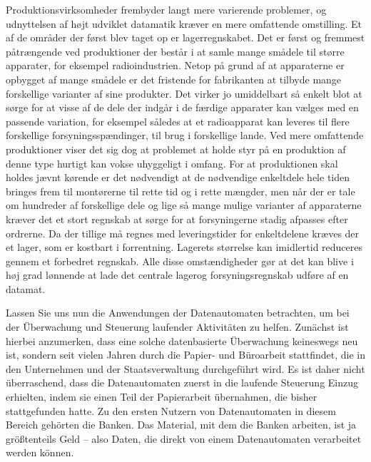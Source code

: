 {Produktionsvirksomheder frembyder langt mere varierende problemer, og udnyttelsen af højt udviklet datamatik kræver en mere omfattende omstilling. Et af de områder der først blev taget op er lagerregnskabet. Det er først og fremmest påtrængende ved produktioner der består i at samle mange smådele til større apparater, for eksempel radioindustrien. Netop på grund af at apparaterne er opbygget af mange smådele er det fristende for fabrikanten at tilbyde mange forskellige varianter af sine produkter. Det virker jo umiddelbart så enkelt blot at sørge for at visse af de dele der indgår i de færdige apparater kan vælges med en passende variation, for eksempel således at et radioapparat kan leveres til flere forskellige forsyningsspændinger, til brug i forskellige lande. Ved mere omfattende produktioner viser det sig dog at problemet at holde styr på en produktion af denne type hurtigt kan vokse uhyggeligt i omfang. For at produktionen skal holdes jævnt kørende er det nødvendigt at de nødvendige enkeltdele hele tiden bringes frem til montørerne til rette tid og i rette mængder, men når der er tale om hundreder af forskellige dele og lige så mange mulige varianter af apparaterne kræver det et stort regnskab at sørge for at forsyningerne stadig afpasses efter ordrerne. Da der tillige må regnes med leveringstider for enkeltdelene kræves der et lager, som er kostbart i forrentning. Lagerets størrelse kan imidlertid reduceres gennem et forbedret regnskab. Alle disse omstændigheder gør at det kan blive i høj grad lønnende at lade det centrale lagerog forsyningsregnskab udføre af en datamat. 
}{
Lassen Sie uns nun die Anwendungen der Datenautomaten betrachten, um bei der Überwachung und Steuerung laufender Aktivitäten zu helfen. Zunächst ist hierbei anzumerken, dass eine solche datenbasierte Überwachung keineswegs neu ist, sondern seit vielen Jahren durch die Papier- und Büroarbeit stattfindet, die in den Unternehmen und der Staatsverwaltung durchgeführt wird. Es ist daher nicht überraschend, dass die Datenautomaten zuerst in die laufende Steuerung Einzug erhielten, indem sie einen Teil der Papierarbeit übernahmen, die bisher stattgefunden hatte. Zu den ersten Nutzern von Datenautomaten in diesem Bereich gehörten die Banken. Das Material, mit dem die Banken arbeiten, ist ja größtenteils Geld -- also Daten, die direkt von einem Datenautomaten verarbeitet werden können.

}
